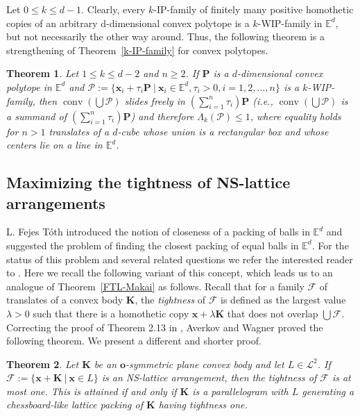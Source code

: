 \documentclass[12pt]{article}
\newtheorem{thm}{Theorem}
\DeclareMathOperator{\conv}{conv}
\newcommand{\xx}{\mathbf{x}}
\newcommand{\KK}{\mathbf K}
\newcommand{\Ee}{{\mathbb E}}
\newcommand{\F}{\mathcal{F}}
\begin{document}
Let $0\leq k\leq d-1$. Clearly, every $k$-IP-family of finitely many positive homothetic copies of an arbitrary d-dimensional
convex polytope is a $k$-WIP-family in $\Ee^d$, but not necessarily the other way around. Thus, the following theorem is a strengthening of Theorem~\ref{k-IP-family} for convex polytopes.

\begin{thm}\label{weak Bezdek-Langi}
Let $1\leq k\leq d-2$ and $n\geq 2$. If $\mathbf{P}$ is a $d$-dimensional convex polytope in $\Ee^d$ and $\mathcal{P} := \{ \xx_i + \tau_i \mathbf{P}\ |\  \xx_i\in \Ee^d, \tau_i>0, i=1,2,\ldots, n\}$ is a $k$-WIP-family, then  $\conv \left( \bigcup \mathcal{P} \right)$ slides freely in $\left( \sum_{i=1}^n \tau_i \right) \mathbf{P}$ (i.e., $\conv \left( \bigcup \mathcal{P} \right)$ is a summand of $\left( \sum_{i=1}^n \tau_i \right) \mathbf{P}$) and therefore $\Lambda_k(\mathcal{P}) \leq 1$, where equality holds for $n>1$ translates of a $d$-cube whose union is a rectangular box and whose centers lie on a line in $\Ee^d$.
\end{thm}



\subsection{Maximizing the tightness of NS-lattice arrangements}

L. Fejes T\'oth \cite{Fe76, Fe78} introduced the notion of closeness of a packing of balls in $\Ee^d$ and suggested the problem of finding the closest packing of equal balls in $\Ee^d$. For the status of this problem and several related questions we refer the interested reader to \cite{LiZo}. Here we recall the following variant of this concept, which leads us to an analogue of Theorem~\ref{FTL-Makai} as follows. Recall that for a family $\F$ of translates of a convex body $\KK$, the \emph{tightness} of $\F$ is defined as the largest value $\lambda > 0$ such that there is a homothetic copy $\xx + \lambda \KK$ that does not overlap $\bigcup \F$. Correcting the proof of Theorem 2.13 in \cite{KaLo}, Averkov and Wagner \cite[Theorem 2.5]{AvWa} proved the following theorem. We present a different and shorter proof.

\begin{thm}\label{max-tightness}
Let $\KK$ be an $\mathbf{o}$-symmetric plane convex body and let $L\in\mathcal{L}^2$. If $\F := \{ \xx+ \KK \  | \ \xx \in L \}$ is an NS-lattice arrangement, then the tightness of $\F$ is at most one. This is attained if and only if $\KK$ is a parallelogram with $L$ generating a chessboard-like lattice packing of $\KK$ having tightness one. 
\end{thm}
\end{document}
